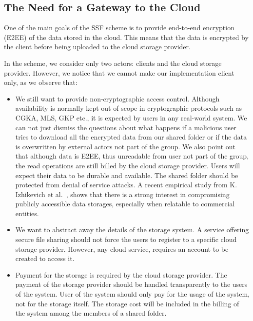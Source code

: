 \subsection{The Need for a Gateway to the Cloud}\label{sc:cloud-storage-access-and-billing}
One of the main goals of the SSF scheme is to provide
end-to-end encryption (E2EE) of the data stored in the cloud.
This means that the data is encrypted by the client before
being uploaded to the cloud storage provider.

In the scheme, we consider only two actors:
clients and the cloud storage provider.
However, we notice that we cannot make our implementation
client only, as we observe that:
\begin{itemize}
    \item We still want to provide non-cryptographic access control. 
    Although availability is normally kept out of scope in cryptographic 
    protocols such as CGKA, MLS, GKP etc., it is expected by users
    in any real-world system. We can not just dismiss the questions about
    what happens if a malicious user tries to download all the encrypted
    data from our shared folder or if the data is overwritten by external
    actors not part of the group. We also point out that although 
    data is E2EE, thus unreadable from user not part of the group,
    the read operations are still billed by the cloud storage provider.
    Users will expect their data to be durable
    and available. The shared folder should be protected from
    denial of service attacks. 
    A recent empirical study from K. Izhikevich et al.~\cite{izhikevich2023using},
    shows that there is a strong interest
    in compromising publicly accessible data storages,
    especially when relatable to commercial entities.
    \item We want to abstract away the details of the storage system.
    A service offering secure file sharing should not force the users
    to register to a specific cloud storage provider. However,
    any cloud service, requires an account to be created to access it.
    \item Payment for the storage is required by the cloud storage provider.
    The payment of the storage provider should be handled transparently
    to the users of the system. User of the system should only pay
    for the usage of the system, not for the storage itself. The storage
    cost will be included in the billing of the system among the members
    of a shared folder.
\end{itemize} 

